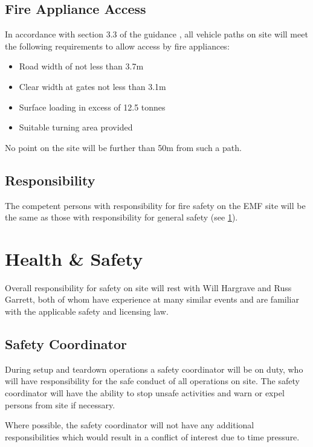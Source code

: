 \subsection{Fire Appliance Access}
In accordance with section 3.3 of the guidance \cite{firesafety}, all vehicle paths on site
will meet the following requirements to allow access by fire appliances:

\begin{itemize}
\tightlist
\item Road width of not less than 3.7m
\item Clear width at gates not less than 3.1m
\item Surface loading in excess of 12.5 tonnes
\item Suitable turning area provided
\end{itemize}

No point on the site will be further than 50m from such a path.

\subsection{Responsibility}
The competent persons with responsibility for fire safety on the EMF site will be the same
as those with responsibility for general safety (see \cref{safety}).

\newpage

\section{Health \& Safety}\label{safety}

Overall responsibility for safety on site will rest with Will Hargrave and
Russ Garrett, both of whom have experience at many similar events and are
familiar with the applicable safety and licensing law.

\subsection{Safety Coordinator}

During setup and teardown operations a safety coordinator will be on
duty, who will have responsibility for the safe conduct of all operations on
site. The safety coordinator will have the ability to stop unsafe activities
and warn or expel persons from site if necessary.

Where possible, the safety coordinator will not have any additional 
responsibilities which would result in a conflict of interest due to time
pressure.

